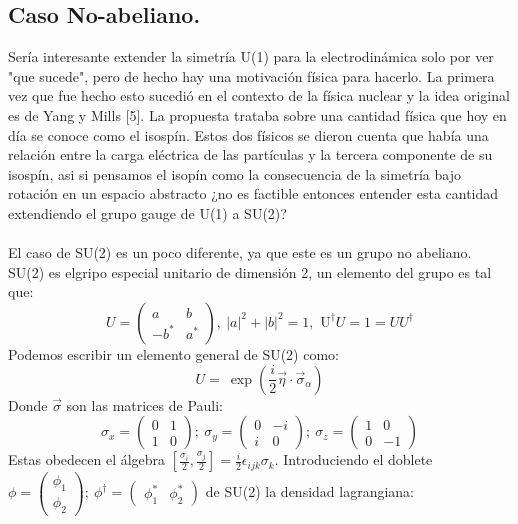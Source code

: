 \subsection{Caso No-abeliano.}
Sería interesante extender la simetría U(1) para la electrodinámica solo por ver "que sucede", pero de hecho hay una motivación física para hacerlo. La primera vez que fue hecho esto sucedió en el contexto de la física nuclear y la idea original es de Yang y Mills [5]. La propuesta trataba sobre una cantidad física que hoy en día se conoce como el isospín. Estos dos físicos se dieron cuenta que había una relación entre la carga eléctrica de las partículas y la tercera componente de su isospín, asi si pensamos el isopín como la consecuencia de la simetría bajo rotación en un espacio abstracto ¿no es factible entonces entender esta cantidad extendiendo el grupo gauge de U(1) a SU(2)?
\\
\\
El caso de SU(2) es un poco diferente, ya que este es un grupo no abeliano. SU(2) es elgripo especial unitario de dimensión 2, un elemento del grupo es tal que: 
\begin{equation}
U=\left(\begin{array}{cc}
a & b\\
-b^{*} & a^{*}
\end{array}\right),\ |a|^{2}+|b|^{2}=1,\text{\ U}^{\dagger}U=1=UU^{\dagger}
\end{equation}
Podemos escribir un elemento general de SU(2) como: 
\begin{equation}
U=\ \exp\left(\frac{i}{2}\vec{\eta}\cdot\vec{\sigma}_\alpha\right)
\end{equation}
Donde $\vec{\sigma}$ son las matrices de Pauli:
\begin{equation}
\sigma_{x}=\left(\begin{array}{cc}
0 & 1\\
1 & 0
\end{array}\right);\ \sigma_{y}=\left(\begin{array}{cc}
0 & -i\\
i & 0
\end{array}\right);\ \sigma_{z}=\left(\begin{array}{cc}
1 & 0\\
0 & -1
\end{array}\right)
\end{equation}
Estas obedecen el álgebra $[\frac{\sigma_i}{2},\frac{\sigma_j}{2}]=\frac{i}{2}\epsilon_{ijk}\sigma_k$.
Introduciendo el doblete $\phi=\left(\begin{array}{c}
\phi_{1}\\
\phi_{2}
\end{array}\right);\ \phi^{\dagger}=\left(\begin{array}{cc}
\phi_{1}^{*} & \phi_{2}^{*}\end{array}\right)$ de SU(2) la densidad lagrangiana:
